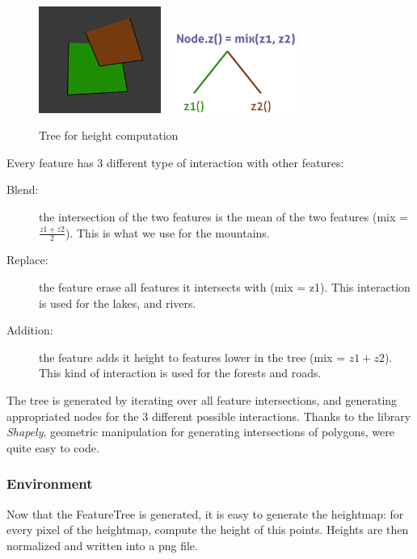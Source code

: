 \begin{figure}[h]
  \begin{center}
      \includegraphics[width=4cm]{img/feature_2.png} ~
      \includegraphics[width=4cm]{img/mix.pdf}
      \caption{Tree for height computation}
      \label{fig:tree}
   \end{center}
\end{figure}

Every feature has 3 different type of interaction with other features:
\begin{description}
  \item[Blend:] the intersection of the two features is the mean of the two features 
  (mix = $\frac{z1+z2}{2}$). This is what we use for the mountains.
  \item[Replace:] the feature erase all features it intersects with (mix = z1). This interaction is used for the lakes, and rivers.
  \item[Addition:] the feature adds it height to features lower in the tree (mix = $z1+z2$). This kind of interaction is used for the forests and roads.
\end{description}

The tree is generated by iterating over all feature intersections, and generating appropriated nodes for the 3 different possible interactions.
Thanks to the library \textit{Shapely}, geometric manipulation for generating intersections of polygons, were quite easy to code.

\subsubsection{Environment}
Now that the FeatureTree is generated, it is easy to generate the heightmap: for every pixel of the heightmap, compute the height of this points. Heights are then normalized and written into a png file.

